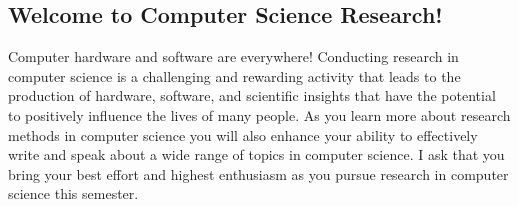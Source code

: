 \documentclass[11pt]{article} %
\begin{document}
\subsection*{\textbf{Welcome to Computer Science Research!}}

Computer hardware and software are everywhere! Conducting research in computer science is a challenging and rewarding activity that leads to the production of hardware, software, and scientific insights that have the potential to positively influence the lives of many people.  As you learn more about research methods in computer science you will also enhance your ability to effectively write and speak about a wide range of topics in computer science. I ask that you bring your best effort and highest enthusiasm as you pursue research in computer science this semester. 
\end{document}
